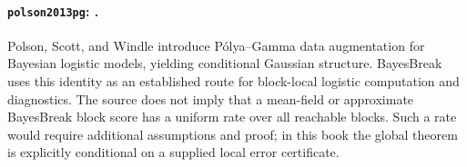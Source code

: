 
\paragraph{\texttt{polson2013pg}: \citet{polson2013pg}.}
Polson, Scott, and Windle introduce P\'olya--Gamma data augmentation for Bayesian logistic models, yielding conditional Gaussian structure. BayesBreak uses this identity as an established route for block-local logistic computation and diagnostics. The source does not imply that a mean-field or approximate BayesBreak block score has a uniform rate over all reachable blocks. Such a rate would require additional assumptions and proof; in this book the global theorem is explicitly conditional on a supplied local error certificate.
